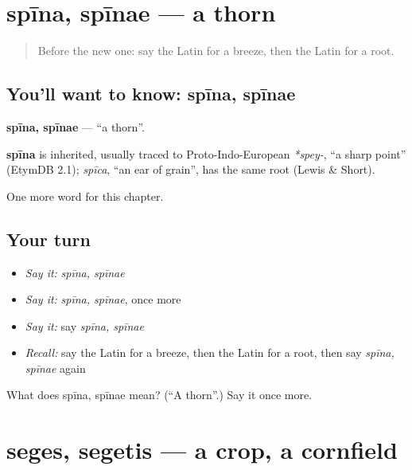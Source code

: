 \section[spīna, spīnae]{spīna, spīnae — a thorn}

\label{lesson:LA-C223-spina}



\begin{quote}
Before the new one: say the Latin for a breeze, then the Latin for a root.
\end{quote}

\subsection*{You'll want to know: spīna, spīnae}
\textbf{spīna, spīnae} — \textquotedblleft{}a thorn\textquotedblright{}.

\begin{cousinweb}
\textbf{spīna} is inherited, usually traced to Proto-Indo-European \emph{*spey-}, \textquotedblleft{}a sharp point\textquotedblright{} (EtymDB 2.1); \emph{spīca}, \textquotedblleft{}an ear of grain\textquotedblright{}, has the same root (Lewis \& Short).
\end{cousinweb}

\begin{grammarlens}[title={What you've built}]
One more word for this chapter.
\end{grammarlens}

\subsection*{Your turn}
\begin{itemize}
\raggedright
  \item \emph{Say it:} \emph{spīna, spīnae}
  \item \emph{Say it:} \emph{spīna, spīnae}, once more
  \item \emph{Say it:} say \emph{spīna, spīnae}
  \item \emph{Recall:} say the Latin for a breeze, then the Latin for a root, then say \emph{spīna, spīnae} again
\end{itemize}

\begin{tcolorbox}[breakable,colback=teal!4,colframe=teal!35!black,title={Before you move on}]
What does spīna, spīnae mean? (\textquotedblleft{}A thorn\textquotedblright{}.) Say it once more.
\end{tcolorbox}
\section[seges, segetis]{seges, segetis — a crop, a cornfield}

